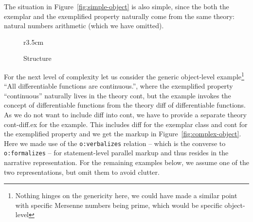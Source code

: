 \documentclass[11pt]{bluenote}
\begin{document}
The situation in Figure~\ref{fig:simple-object} is also simple, since the both the
exemplar and the exemplified property naturally come from the same theory: natural numbers
arithmetic (which we have omitted).


\begin{wrapfigure}r{3.5cm}\centering%
\vspace*{-1em}
\caption{Structure}\label{fig:diffcont}\vspace*{-1em}
\end{wrapfigure}
For the next level of complexity let us consider the generic object-level
example\footnote{Nothing hinges on the genericity here, we could have made a similar point
  with specific Mersenne numbers being prime, which would be specific object-level} ``All
differentiable functions are continuous.'', where the exemplified property ``continuous''
naturally lives in the theory \textsf{cont}, but the example invokes the concept of
differentiable functions from the theory \textsf{diff} of differentiable functions. As we
do not want to include \textsf{diff} into \textsf{cont}, we have to provide a separate
theory \textsf{cont-diff.ex} for the example. This includes \textsf{diff} for the exemplar
class and \textsf{cont} for the exemplified property and we get the markup in
Figure~\ref{fig:complex-object}. Here we made use of the \lstinline|o:verbalizes| relation
-- which is the converse to \lstinline|o:formalizes| -- for statement-level parallel
markup and thus resides in the narrative representation. For the remaining examples below,
we assume one of the two representations, but omit them to avoid clutter.
\end{document}
